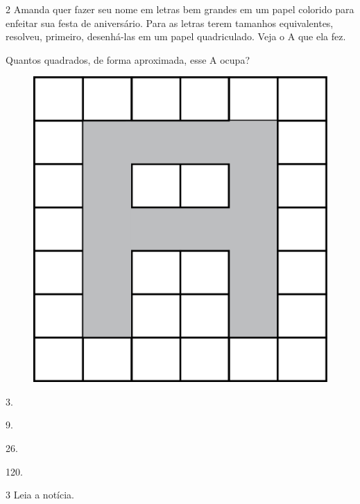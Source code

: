 \num{2} Amanda quer fazer seu nome em letras bem grandes em um papel colorido para enfeitar sua festa de aniversário. Para as letras terem tamanhos equivalentes, resolveu, primeiro, desenhá-las em um papel quadriculado. Veja o A que ela fez.

Quantos quadrados, de forma aproximada, esse A ocupa?

\begin{figure}[htpb!]
\centering
\includegraphics[width=.8\textwidth]{./media/image62.png}
\end{figure}

\begin{multicols}{2}
\begin{escolha}
\item
  3.
\item
  9.
\item
  26.
\item
  120.
\end{escolha}
\end{multicols}

\pagebreak
\num{3} Leia a notícia.


